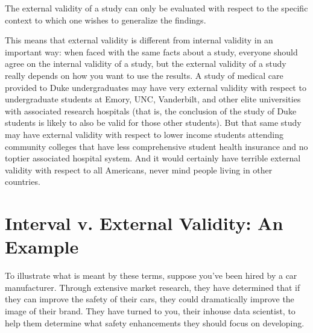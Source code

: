 \documentclass[letterpaper,10pt,english]{jupyterBook}
\begin{document}
\begin{sphinxShadowBox}

\sphinxAtStartPar
The external validity of a study can only be evaluated with respect to the specific context to which one wishes to generalize the findings.
\end{sphinxShadowBox}

\sphinxAtStartPar
This means that external validity is different from internal validity in an important way: when faced with the same facts about a study, everyone should  agree on the internal validity of a study, but the external validity of a study really depends on how you want to use the results. A study of medical care provided to Duke undergraduates may have very  external validity with respect to undergraduate students at Emory, UNC, Vanderbilt, and other elite universities with associated research hospitals (that is, the conclusion of the study of Duke students is likely to also be valid for those other students). But that same study may have  external validity with respect to lower income students attending community colleges that have less comprehensive student health insurance and no top\sphinxhyphen{}tier associated hospital system. And it would certainly have terrible external validity with respect to all Americans, never mind people living in other countries.


\section{Interval v. External Validity: An Example}
\label{\detokenize{30_questions/15_answering_exploratory_questions:interval-v-external-validity-an-example}}
\sphinxAtStartPar
To illustrate what is meant by these terms, suppose you’ve been hired by a car manufacturer. Through extensive market research, they have determined that if they can improve the safety of their cars, they could dramatically improve the image of their brand. They have turned to you, their in\sphinxhyphen{}house data scientist, to help them determine what safety enhancements they should focus on developing.
\end{document}
